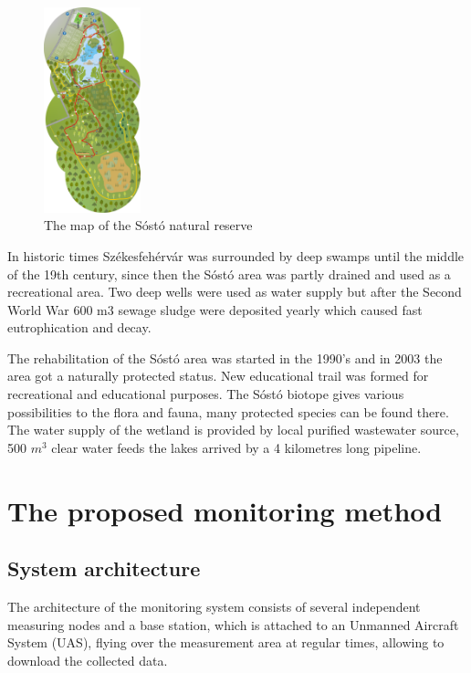 \documentclass[conference]{IEEEtran}
\begin{document}
\begin{figure}[htbp]
	\centering
	\includegraphics[width=0.25\textwidth]{fig/map1.png}
  \caption{The map of the Sóstó natural reserve}
	\label{fig-map1}
\end{figure}

In historic times Székesfehérvár was surrounded by deep swamps until the middle
of the 19th century, since then the Sóstó area was partly drained and used as a
recreational area. Two deep wells were used as water supply but after the
Second World War 600 m3 sewage sludge were deposited yearly which caused fast
eutrophication and decay.

The rehabilitation of the Sóstó area was started in the 1990’s and in 2003 the
area got a naturally protected status. New educational trail was formed for
recreational and educational purposes. The Sóstó biotope gives various
possibilities to the flora and fauna, many protected species can be found
there. The water supply of the wetland is provided by local purified wastewater
source, 500 $m^3$ clear water feeds the lakes arrived by a 4 kilometres long
pipeline.


\section{The proposed monitoring method}

\subsection{System architecture}

The architecture of the monitoring system consists of several independent
measuring nodes and a base station, which is attached to an Unmanned Aircraft System (UAS), flying
over the measurement area at regular times, allowing to download the
collected data.
\end{document}
